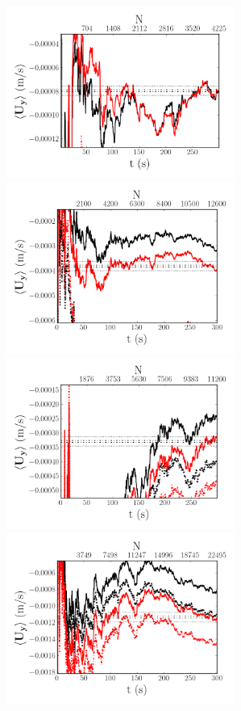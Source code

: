 \documentclass[12pt,oneside,a4paper]{article}
\begin{document}
\begin{figure}
\centering
\includegraphics[width=7.5cm]{images/LDA_timeDependenceImages/4hz_x_400_z_1_MeanUy.png}\hfill
\includegraphics[width=7.5cm]{images/LDA_timeDependenceImages/8hz_x_400_z_1_MeanUy.png}\\
\includegraphics[width=7.5cm]{images/LDA_timeDependenceImages/4hz_x_400_z_15_MeanUy.png}\hfill
\includegraphics[width=7.5cm]{images/LDA_timeDependenceImages/8hz_x_400_z_15_MeanUy.png}\\

\end{figure}
\end{document}
